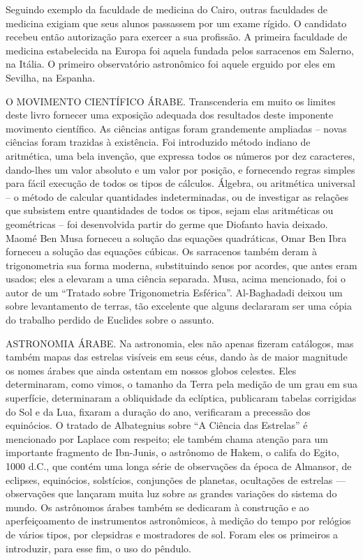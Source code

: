 \documentclass[11pt,a5paper,twoside,openany]{book}
\begin{document}
Seguindo exemplo da faculdade de medicina do Cairo, outras faculdades de medicina exigiam que seus alunos passassem por um exame rígido. O candidato recebeu então autorização para exercer a sua profissão. A primeira faculdade de medicina estabelecida na Europa foi aquela fundada pelos sarracenos em Salerno, na Itália. O primeiro observatório astronômico foi aquele erguido por eles em Sevilha, na Espanha.

O MOVIMENTO CIENTÍFICO ÁRABE. Transcenderia em muito os limites deste livro fornecer uma exposição adequada dos resultados deste imponente movimento científico. As ciências antigas foram grandemente ampliadas – novas ciências foram trazidas à existência. Foi introduzido método indiano de aritmética, uma bela invenção, que expressa todos os números por dez caracteres, dando-lhes um valor absoluto e um valor por posição, e fornecendo regras simples para fácil execução de todos os tipos de cálculos. Álgebra, ou aritmética universal – o método de calcular quantidades indeterminadas, ou de investigar as relações que subsistem entre quantidades de todos os tipos, sejam elas aritméticas ou geométricas – foi desenvolvida partir do germe que Diofanto havia deixado. Maomé Ben Musa forneceu a solução das equações quadráticas, Omar Ben Ibra forneceu a solução das equações cúbicas. Os sarracenos também deram à trigonometria sua forma moderna, substituindo senos por acordes, que antes eram usados; eles a elevaram a uma ciência separada. Musa, acima mencionado, foi o autor de um “Tratado sobre Trigonometria Esférica”. Al-Baghadadi deixou um sobre levantamento de terras, tão excelente que alguns declararam ser uma cópia do trabalho perdido de Euclides sobre o assunto.

ASTRONOMIA ÁRABE. Na astronomia, eles não apenas fizeram catálogos, mas também mapas das estrelas visíveis em seus céus, dando às de maior magnitude os nomes árabes que ainda ostentam em nossos globos celestes. Eles determinaram, como vimos, o tamanho da Terra pela medição de um grau em sua superfície, determinaram a obliquidade da eclíptica, publicaram tabelas corrigidas do Sol e da Lua, fixaram a duração do ano, verificaram a precessão dos equinócios. O tratado de Albategnius sobre “A Ciência das Estrelas” é mencionado por Laplace com respeito; ele também chama atenção para um importante fragmento de Ibn-Junis, o astrônomo de Hakem, o califa do Egito, 1000 d.C., que contém uma longa série de observações da época de Almansor, de eclipses, equinócios, solstícios, conjunções de planetas, ocultações de estrelas — observações que lançaram muita luz sobre as grandes variações do sistema do mundo. Os astrônomos árabes também se dedicaram à construção e ao aperfeiçoamento de instrumentos astronômicos, à medição do tempo por relógios de vários tipos, por clepsidras e mostradores de sol. Foram eles os primeiros a introduzir, para esse fim, o uso do pêndulo.
\end{document}
